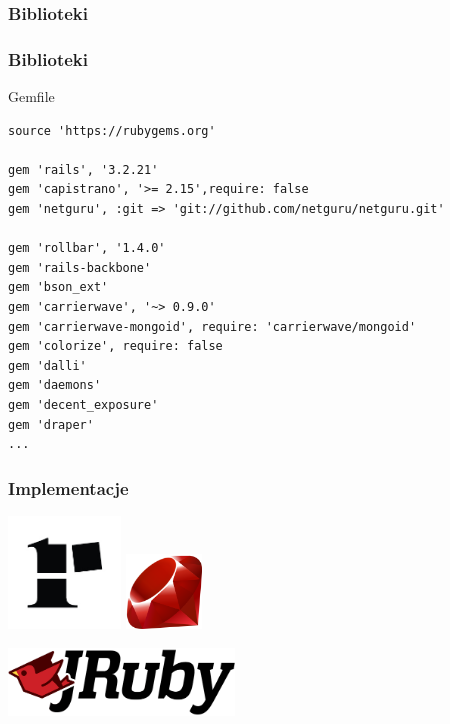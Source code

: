 
\begin{frame}[fragile]
\frametitle{Biblioteki}
\end{frame}


\begin{frame}[fragile]
\frametitle{Biblioteki}
\begin{block}{Gemfile}
\begin{lstlisting}[style=Ruby,basicstyle=\tiny\ttfamily]
source 'https://rubygems.org'

gem 'rails', '3.2.21'
gem 'capistrano', '>= 2.15',require: false
gem 'netguru', :git => 'git://github.com/netguru/netguru.git'

gem 'rollbar', '1.4.0'
gem 'rails-backbone'
gem 'bson_ext'
gem 'carrierwave', '~> 0.9.0'
gem 'carrierwave-mongoid', require: 'carrierwave/mongoid'
gem 'colorize', require: false
gem 'dalli'
gem 'daemons'
gem 'decent_exposure'
gem 'draper'
...
\end{lstlisting}
\end{block}
\end{frame}


\begin{frame}[fragile]
\frametitle{Implementacje}
    \includegraphics[width=3cm]{rubinius.jpg}
    \hspace{5cm}
    \includegraphics[width=2cm]{Ruby_logo.png}

    \hspace{1.5cm}
    \includegraphics[width=6cm]{jruby.png}
\end{frame}
